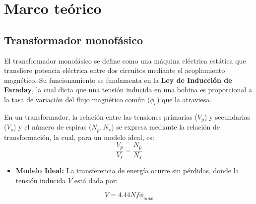 \section{Marco teórico}

\subsection{Transformador monofásico}
El transformador monofásico se define como una máquina eléctrica estática que transfiere potencia eléctrica entre dos circuitos mediante el acoplamiento magnético. Su funcionamiento se fundamenta en la \textbf{Ley de Inducción de Faraday}, la cual dicta que una tensión inducida en una bobina es proporcional a la tasa de variación del flujo magnético común ($\phi_c$) que la atraviesa. 

En un transformador, la relación entre las tensiones primarias ($V_p$) y secundarias ($V_s$) y el número de espiras ($N_p, N_s$) se expresa mediante la relación de transformación, la cual, para un modelo ideal, es:
\begin{equation}
\frac{V_p}{V_s} = \frac{N_p}{N_s}
\end{equation}


\begin{itemize}
    \item \textbf{Modelo Ideal:} La transferencia de energía ocurre sin pérdidas, donde la tensión inducida $V$ está dada por:
\end{itemize}

$$V = 4.44 N f \phi_{max}$$

